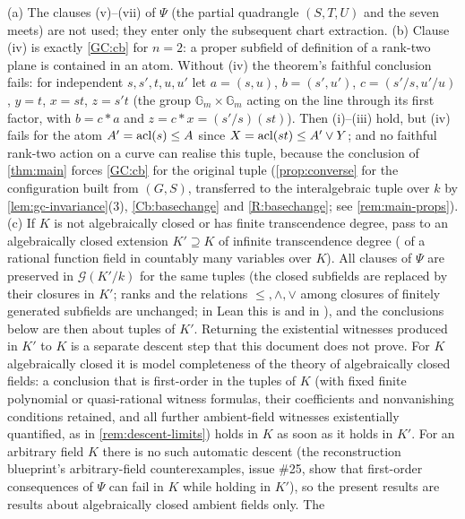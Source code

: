 \begin{remark}\label{rem:psi-hyp}
(a) The clauses (v)--(vii) of $\Psi$ (the partial quadrangle $(S,T,U)$ and the seven
meets) are not used; they enter only the subsequent chart extraction.
(b) Clause (iv) is exactly \ref{GC:cb} for $n=2$: a proper subfield of definition of a
rank-two plane is contained in an atom.  Without (iv) the theorem's faithful conclusion
fails: for independent $s,s',t,u,u'$ let $a=(s,u)$, $b=(s',u')$, $c=(s'/s,u'/u)$,
$y=t$, $x=st$, $z=s't$ (the group $\mathbb G_m\times\mathbb G_m$ acting on the line
through its first factor, with $b=c\ast a$ and $z=c\ast x=(s'/s)(st)$).  Then (i)--(iii)
hold, but (iv) fails for the atom $A'=\operatorname{acl}(s)\le A$ since $X=\operatorname{acl}(st)\le A'\vee Y$; and no
faithful rank-two action on a curve can realise this tuple, because the conclusion of
\cref{thm:main} forces \ref{GC:cb} for the original tuple (\cref{prop:converse} for the
configuration built from $(G,S)$, transferred to the interalgebraic tuple over $k$ by
\cref{lem:gc-invariance}(3), \ref{Cb:basechange} and \ref{R:basechange}; see
\cref{rem:main-props}).
(c) If $K$ is not algebraically closed or has finite transcendence degree, pass to an
algebraically closed extension $K'\supseteq K$ of infinite transcendence degree
( of a rational function field in countably many variables over
$K$).  All clauses of $\Psi$ are preserved in $\mathcal G(K'/k)$ for the same tuples (the
closed subfields are replaced by their closures in $K'$; ranks and the relations
$\le,\wedge,\vee$ among closures of finitely generated subfields are unchanged; in Lean
this is  and  in
), and the conclusions below are then about tuples
of $K'$.  Returning the existential witnesses produced in $K'$ to $K$ is a separate
descent step that this document does not prove.  For $K$ algebraically closed it is
model completeness of the theory of algebraically closed fields: a conclusion that is
first-order in the tuples of $K$ (with fixed finite polynomial or quasi-rational
witness formulas, their coefficients and nonvanishing conditions retained, and all
further ambient-field witnesses existentially quantified, as in
\cref{rem:descent-limits}) holds in $K$ as soon as it
holds in $K'$.  For an arbitrary field $K$ there is no such automatic descent (the
reconstruction blueprint's arbitrary-field counterexamples, issue \#25, show that
first-order consequences of $\Psi$ can fail in $K$ while holding in $K'$), so the
present results are results about algebraically closed ambient fields only.  The

\end{remark}
